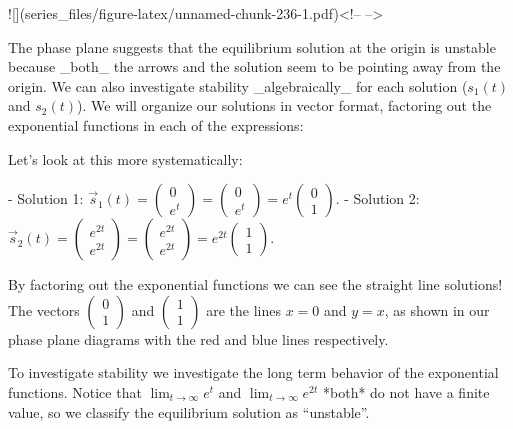 \documentclass[
]{book}
\theoremstyle{definition}
\theoremstyle{definition}
\theoremstyle{definition}
\theoremstyle{remark}
\begin{document}
![](series_files/figure-latex/unnamed-chunk-236-1.pdf)<!-- --> 


The phase plane suggests that the equilibrium solution at the origin is unstable because _both_ the arrows and the solution seem to be pointing away from the origin.  We can also investigate stability _algebraically_ for each solution ($s_{1}(t)$ and $s_{2}(t)$).  We will organize our solutions in vector format, factoring out the exponential functions in each of the expressions:

Let’s look at this more systematically:

- Solution 1: $\displaystyle  \vec{s}_{1}(t) = \begin{pmatrix} 0 \\ e^{t} \end{pmatrix}= \begin{pmatrix} 0 \\ e^{t} \end{pmatrix} =e^{t}  \begin{pmatrix} 0 \\ 1  \end{pmatrix}$.
- Solution 2:  $\displaystyle \vec{s}_{2}(t) = \begin{pmatrix} e^{2t} \\ e^{2t} \end{pmatrix}= \begin{pmatrix} e^{2t} \\ e^{2t} \end{pmatrix} = e^{2t}  \begin{pmatrix} 1 \\ 1\end{pmatrix}$. 

By factoring out the exponential functions we can see the straight line solutions!  The vectors $\displaystyle  \begin{pmatrix} 0 \\ 1\end{pmatrix}$ and $\displaystyle  \begin{pmatrix} 1 \\ 1\end{pmatrix}$ are the lines $x=0$ and $y=x$, as shown in our phase plane diagrams with the red and blue lines respectively.

To investigate stability we investigate the long term behavior of the exponential functions. Notice that $\displaystyle \lim_{t \rightarrow \infty}   e^{t}$ and $\displaystyle \lim_{t \rightarrow \infty}   e^{2t}$ *both* do not have a finite value, so we classify the equilibrium solution as “unstable”.
\end{document}
